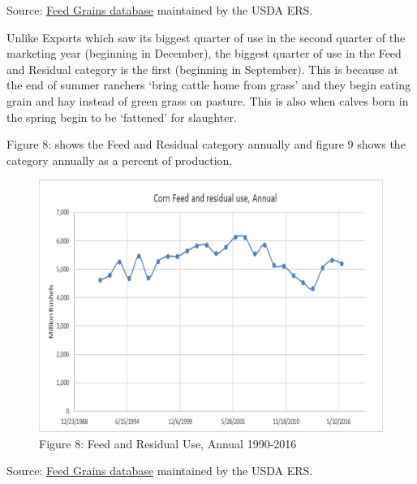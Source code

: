 \documentclass[]{book}
\theoremstyle{definition}
\theoremstyle{definition}
\theoremstyle{remark}
\begin{document}
Source:
\href{http://www.ers.usda.gov/data-products/feed-grains-database/feed-grains-yearbook-tables.aspx\#26780}{Feed
Grains database} maintained by the USDA ERS.

Unlike Exports which saw its biggest quarter of use in the second
quarter of the marketing year (beginning in December), the biggest
quarter of use in the Feed and Residual category is the first (beginning
in September). This is because at the end of summer ranchers `bring
cattle home from grass' and they begin eating grain and hay instead of
green grass on pasture. This is also when calves born in the spring
begin to be `fattened' for slaughter.

Figure 8: shows the Feed and Residual category annually and figure 9
shows the category annually as a percent of production.

\begin{figure}[htbp]
\centering
\includegraphics{Excel-files/IntroductiontoCommodityTS-FeedGrains_Corn_files/image025.png}
\caption{Figure 8: Feed and Residual Use, Annual 1990-2016}
\end{figure}

Source:
\href{http://www.ers.usda.gov/data-products/feed-grains-database/feed-grains-yearbook-tables.aspx\#26780}{Feed
Grains database} maintained by the USDA ERS.
\end{document}
